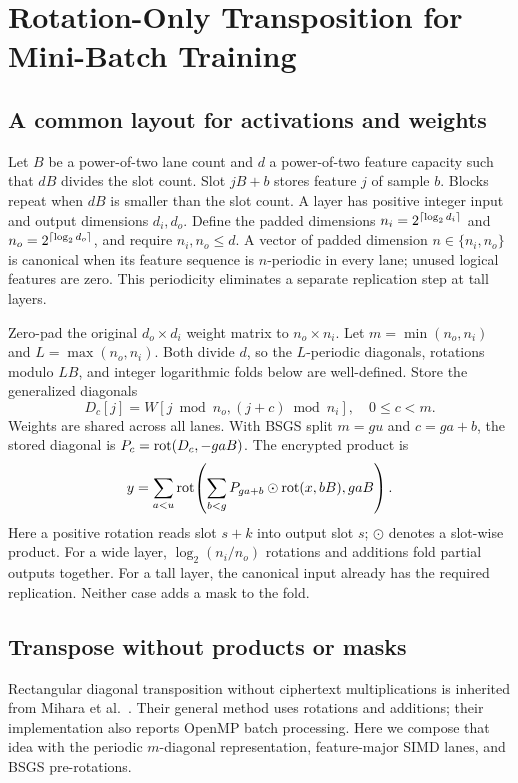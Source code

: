 \section{Rotation-Only Transposition for Mini-Batch Training}
\label{sec:packing}
\subsection{A common layout for activations and weights}
Let $B$ be a power-of-two lane count and $d$ a power-of-two feature capacity such that $dB$ divides the slot count. Slot $jB+b$ stores feature $j$ of sample $b$. Blocks repeat when $dB$ is smaller than the slot count. A layer has positive integer input and output dimensions $d_i,d_o$. Define the padded dimensions $n_i=2^{\left\lceil \log_2 d_i\right\rceil}$ and $n_o=2^{\left\lceil \log_2 d_o\right\rceil}$, and require $n_i,n_o\le d$. A vector of padded dimension $n\in\{n_i,n_o\}$ is canonical when its feature sequence is $n$-periodic in every lane; unused logical features are zero. This periodicity eliminates a separate replication step at tall layers.

Zero-pad the original $d_o\times d_i$ weight matrix to $n_o\times n_i$. Let $m=\min(n_o,n_i)$ and $L=\max(n_o,n_i)$. Both divide $d$, so the $L$-periodic diagonals, rotations modulo $LB$, and integer logarithmic folds below are well-defined. Store the generalized diagonals
\begin{equation}
 D_c[j]=W[j\bmod n_o,(j+c)\bmod n_i],\quad 0\le c<m.
 \label{eq:diagonal}
\end{equation}
Weights are shared across all lanes. With BSGS split $m=gu$ and $c=ga+b$, the stored diagonal is
$P_c=\operatorname{rot}(D_c,-gaB)$. The encrypted product is
\begin{equation}
 y=\sum_{a<u}\operatorname{rot}\!\left(\sum_{b<g}P_{ga+b}\odot\operatorname{rot}(x,bB),gaB\right).
 \label{eq:bsgs}
\end{equation}
Here a positive rotation reads slot $s+k$ into output slot $s$; $\odot$ denotes a slot-wise product. For a wide layer, $\log_2(n_i/n_o)$ rotations and additions fold partial outputs together. For a tall layer, the canonical input already has the required replication. Neither case adds a mask to the fold.

\subsection{Transpose without products or masks}
Rectangular diagonal transposition without ciphertext multiplications is inherited from Mihara et al.~\cite{mihara2020}. Their general method uses rotations and additions; their implementation also reports OpenMP batch processing. Here we compose that idea with the periodic $m$-diagonal representation, feature-major SIMD lanes, and BSGS pre-rotations.

